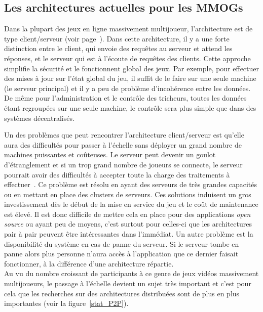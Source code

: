 	\subsection{Les architectures actuelles pour les MMOGs}
	\par Dans la plupart des jeux en ligne massivement multijoueur, l'architecture est de type client/serveur (voir page~\pageref{P2P/ClServ}). Dans cette architecture, il y a une forte distinction entre le client, qui envoie des requêtes au serveur et attend les réponses, et le serveur qui est à l'écoute de requêtes des clients. Cette approche simplifie la sécurité et le fonctionnent global des jeux. Par exemple, pour effectuer des mises à jour sur l'état global du jeu, il suffit de le faire sur une seule machine (le serveur principal) et il y a peu de problème d'incohérence entre les données. De même pour l'administration et le contrôle des tricheurs, toutes les données étant regroupées sur une seule machine, le contrôle sera plus simple que dans des systèmes décentralisés. \\
	\par Un des problèmes que peut rencontrer l'architecture client/serveur est qu'elle aura des difficultés pour passer à l'échelle sans déployer un grand nombre de machines puissantes et coûteuses. Le serveur peut devenir un goulot d'étranglement et si un trop grand nombre de joueurs se connecte, le serveur pourrait avoir des difficultés à accepter toute la charge des traitements à effectuer~\cite{1198269}. Ce problème est résolu en ayant des serveurs de très grandes capacités ou en mettant en place des clusters de serveurs. Ces solutions induisent un gros investissement dès le début de la mise en service du jeu et le coût de maintenance est élevé. Il est donc difficile de mettre cela en place pour des applications \textit{open source} ou ayant peu de moyens, c'est surtout pour celles-ci que les architectures pair à pair peuvent être intéressantes dans l'immédiat. Un autre problème est la disponibilité du système en cas de panne du serveur. Si le serveur tombe en panne alors plus personne n'aura accès à l'application que ce dernier faisait fonctionner, à la différence d'une architecture répartie. \\
	Au vu du nombre croissant de participants à ce genre de jeux vidéos massivement multijoueurs, le passage à l'échelle devient un sujet très important et c'est pour cela que les recherches sur des architectures distribuées sont de plus en plus importantes (voir la figure~\ref{stat_P2P}). \\
